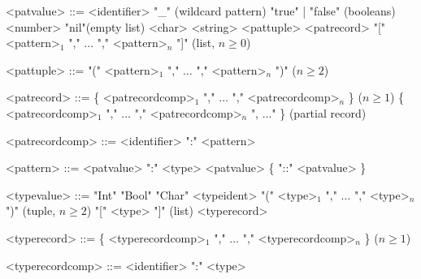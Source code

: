 \documentclass{article}
\begin{document}
\begin{grammar}
  <patvalue> ::= <identifier>
  \alt "_" \hfill (wildcard pattern)
  \alt "true" | "false" \hfill (booleans)
  \alt <number>
  \alt "nil"\hfill (empty list)
  \alt <char>
  \alt <string>
  \alt <pattuple>
  \alt <patrecord>
  \alt "[" \textvisiblespace <pattern>$_1$ "," \textvisiblespace $\ldots$ "," \textvisiblespace <pattern>$_n$ "]" \textvisiblespace \hfill (list, $n \geq 0$)
\end{grammar}

\begin{grammar}
  <pattuple> ::= "(" \textvisiblespace <pattern>$_1$ "," \textvisiblespace $\ldots$ "," \textvisiblespace <pattern>$_n$ ")" \textvisiblespace \hfill ($n \geq 2$)
\end{grammar}

\begin{grammar}
  <patrecord> ::= \{ \textvisiblespace <patrecordcomp>$_1$ "," \textvisiblespace $\ldots$ "," \textvisiblespace <patrecordcomp>$_n$ \} \textvisiblespace \hfill ($n \geq 1$)
  \alt \{ \textvisiblespace <patrecordcomp>$_1$ "," \textvisiblespace $\ldots$ "," \textvisiblespace <patrecordcomp>$_n$ ", ..." \textvisiblespace \} \textvisiblespace \hfill (partial record)

  <patrecordcomp> ::= <identifier> \textvisiblespace ":" \textvisiblespace <pattern>
\end{grammar}

\begin{grammar}
  <pattern> ::= <patvalue> \textvisiblespace ":" \textvisiblespace <type>
  \alt <patvalue> \textvisiblespace \{ "::" \textvisiblespace <patvalue> \textvisiblespace \}
\end{grammar}

\begin{grammar}
  <typevalue> ::= "Int"
  \alt "Bool"
  \alt "Char"
  \alt <typeident>
  \alt "(" \textvisiblespace <type>$_1$ "," \textvisiblespace $\ldots$ "," \textvisiblespace <type>$_n$ ")" \textvisiblespace \hfill (tuple, $n \geq 2$)
  \alt "[" \textvisiblespace <type> \textvisiblespace "]" \textvisiblespace \hfill (list)
  \alt <typerecord>
\end{grammar}

\begin{grammar}
  <typerecord> ::= \{ \textvisiblespace <typerecordcomp>$_1$ "," \textvisiblespace $\ldots$ "," \textvisiblespace <typerecordcomp>$_n$ \} \textvisiblespace \hfill ($n \geq 1$)

  <typerecordcomp> ::= <identifier> \textvisiblespace ":" \textvisiblespace <type>
\end{grammar}
\end{document}
